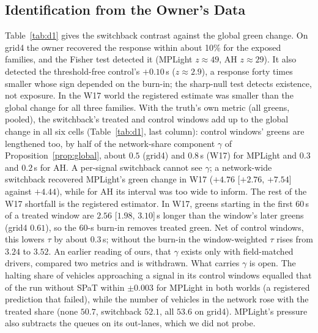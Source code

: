 \subsection{Identification from the Owner's Data}\label{sec:d1}
Table~\ref{tab:d1} gives the switchback contrast against the global green change. On grid4 the owner recovered the response within
about 10\% for the exposed families, and the Fisher test detected it (MPLight $z\approx49$, AH $z\approx29$). It also detected the
threshold-free control's $+0.10$\,s ($z\approx2.9$), a response forty times smaller whose sign depended on the burn-in; the sharp-null
test detects existence, not exposure. In the W17 world the registered estimate was smaller than the global change for all three
families. With the truth's own metric (all greens, pooled), the switchback's treated and control windows add up to the global change in
all six cells (Table~\ref{tab:d1}, last column): control windows' greens are lengthened too, by half of the network-share component
$\gamma$ of Proposition~\ref{prop:global}, about $0.5$ (grid4) and $0.8$\,s (W17) for MPLight and $0.3$ and $0.2$\,s for AH. A per-signal
switchback cannot see $\gamma$; a network-wide switchback recovered MPLight's green change in W17 ($+4.76$ [$+2.76$, $+7.54$] against
$+4.44$), while for AH its interval was too wide to inform. The rest of the W17 shortfall is the registered estimator. In W17, greens
starting in the first 60\,s of a treated window are $2.56$ [$1.98$, $3.10$]\,s longer than the window's later greens (grid4 $0.61$), so
the 60-s burn-in removes treated green. Net of control windows, this lowers $\tau$ by about $0.3$\,s; without the burn-in the
window-weighted $\tau$ rises from $3.24$ to $3.52$. An earlier reading of ours, that $\gamma$ exists only with field-matched drivers,
compared two metrics and is withdrawn. What carries $\gamma$ is open. The halting share of vehicles approaching a signal in its control
windows equalled that of the run without SPaT within $\pm0.003$ for MPLight in both worlds (a registered prediction that failed), while
the number of vehicles in the network rose with the treated share (none $50.7$, switchback $52.1$, all $53.6$ on grid4). MPLight's
pressure also subtracts the queues on its out-lanes, which we did not probe.

